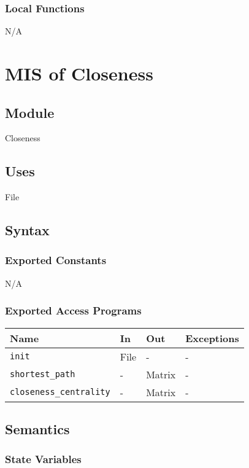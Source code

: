 \documentclass[12pt, titlepage]{article}
\begin{document}
\subsubsection{Local Functions}

N/A

\newpage

\section{MIS of Closeness} \label{Module} 


\subsection{Module}
Closeness

\subsection{Uses}
File
\subsection{Syntax}

\subsubsection{Exported Constants}
N/A
\subsubsection{Exported Access Programs}
\begin{center}
\begin{tabular}{|p{3cm}|p{2.5cm}|p{2.5cm}|p{4cm}|}
\hline
\textbf{Name} & \textbf{In} & \textbf{Out} & \textbf{Exceptions} \\
\hline
\texttt{init} & File & - & - \\
\texttt{shortest\_path} & - & Matrix & - \\
\texttt{closeness\_centrality} & - & Matrix & - \\
\hline
\end{tabular}
\end{center}

\subsection{Semantics}

\subsubsection{State Variables}
\end{document}
